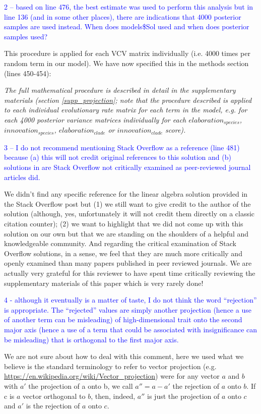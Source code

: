 \documentclass[12pt,letterpaper]{article}
\begin{document}
{\textcolor{blue}{2 – based on line 476, the best estimate was used to perform this analysis but in line 136 (and in some other places), there are indications that 4000 posterior samples are used instead. When does models\$Sol used and when does posterior samples used?}

This procedure is applied for each VCV matrix individually (i.e. 4000 times per random term in our model). We have now specified this in the methods section (lines 450-454):

\noindent\textit{The full mathematical procedure is described in detail in the supplementary materials (section \ref{supp_projection};  note that the procedure described is applied to each individual evolutionary rate matrix for each term in the model, e.g. for each 4000 posterior variance matrices individually for each $elaboration_{species}$, $innovation_{species}$, $elaboration_{clade}$ or $innovation_{clade}$ score).}

\textcolor{blue}{3 – I do not recommend mentioning Stack Overflow as a reference (line 481) because (a) this will not credit original references to this solution and (b) solutions in are Stack Overflow not critically examined as peer-reviewed journal articles did.}

We didn’t find any specific reference for the linear algebra solution provided in the Stack Overflow post but (1) we still want to give credit to the author of the solution (although, yes, unfortunately it will not credit them directly on a classic citation counter); (2) we want to highlight that we did not come up with this solution on our own but that we are standing on the shoulders of a helpful and knowledgeable community. And regarding the critical examination of Stack Overflow solutions, in a sense, we feel that they are much more critically and openly examined than many papers published in peer reviewed journals. We are actually very grateful for this reviewer to have spent time critically reviewing the supplementary materials of this paper which is very rarely done!

\textcolor{blue}{4 - although it eventually is a matter of taste, I do not think the word “rejection” is appropriate. The “rejected” values are simply another projection (hence a use of another term can be misleading) of high-dimensional trait onto the second major axis (hence a use of a term that could be associated with insignificance can be misleading) that is orthogonal to the first major axis.}

We are not sure about how to deal with this comment, here we used what we believe is the standard terminology to refer to vector projection (e.g. \url{https://en.wikipedia.org/wiki/Vector_projection}) were for any vector $a$ and $b$ with $a'$ the projection of a onto b, we call $a'' = a - a'$ the rejection of $a$ onto $b$. If c is $a$ vector orthogonal to $b$, then, indeed, $a''$ is just the projection of $a$ onto $c$ and $a'$ is the rejection of $a$ onto $c$.

}
\end{document}
